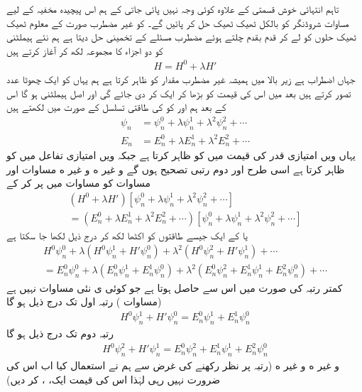 تاہم انتہائی خوش قسمتی کے علاوہ  کوئی وجہ   نہیں  پائی  جاتی کے ہم اس  پیچیدہ مخفیہ کے لیے مساوات شروڈنگر کو بالکل ٹھیک ٹھیک حل کر  پائیں  گے۔  کو    غیر  مضطرب صورت کے معلوم ٹھیک ٹھیک حلوں کو لے کر قدم بقدم چلتے ہوئے مضطرب مسئلے کے تخمینی حل دیتا ہے ہم نئے  ہیملٹنی کو دو اجزاء کا  مجموعہ لکھ کر آغاز کرتے ہیں 
\begin{align}
H = H^0 + \lambda H'
\end{align}
جہاں  اضطراب ہے زیر بالا میں  ہمیشہ  غیر  مضطرب مقدار کو ظاہر کرتا ہے ہم یہاں  کو ایک چھوٹا عدد تصور کرتے ہیں بعد میں اس کی قیمت کو بڑھا کر ایک  کر دی جائے گی اور  اصل ہیملٹنی ہو گا اس کے بعد ہم  اور  کو  کی طاقتی تسلسل کے صورت میں لکھتے ہیں 
\begin{align}
\psi_n &= \psi_n^0 + \lambda\psi_n^1 + \lambda^2\psi_n^2+\cdots \label{مساوات_اضطراب_سائے_این}\\
E_n &= E_n^0 + \lambda E_n^1 + \lambda^2 E_n^2+\cdots \label{مساوات_اضطراب_ای_این}
\end{align} 
یہاں  ویں امتیازی قدر کی قیمت میں  کو  ظاہر کرتا ہے جبکہ  ویں امتیازی تفاعل میں  کو   ظاہر کرتا ہے اسی طرح  اور  دوم رتبی تصحيح ہوں گے و غیر ه و  غیر ه مساوات  اور مساوات  کو مساوات  میں پر کر کے 
\begin{multline*}
(H^0 + \lambda H')[\psi_n^0 + \lambda \psi_n^1 + \lambda^2 \psi_n^2 + \cdots]\\
= (E_n^0 + \lambda E_n^1 + \lambda^2 E_n^2 + \cdots)[\psi_n^0 + \lambda \psi_n^1 + \lambda^2 \psi_n^2 + \cdots]
\end{multline*}
یا  کے ایک جیسے طاقتوں کو اکٹھا لکھ کر درج ذیل لکھا جا سکتا ہے 
\begin{multline*}
H^0 \psi_n^0 + \lambda (H^0 \psi_n^1 + H' \psi_n^0) + \lambda^2 (H^0 \psi_n^2 + H' \psi_n^1) + \cdots \\
= E_n^0 \psi_n^0 + \lambda (E_n^0 \psi_n^1 + E_n^1 \psi_n^0) + \lambda^2 (E_n^0 \psi_n^2 + E_n^1 \psi_n^1 + E_n^2 \psi_n^0) + \cdots
\end{multline*}
 کمتر رتبہ  کی صورت میں اس سے  حاصل ہوتا ہے جو  کوئی ی نئی مساوات نہیں ہے (مساوات ) رتبہ اول  تک درج ذیل ہو گا 
\begin{align}\label{مساوات_اضطراب_رتبہ_اول}
H^0 \psi_n^1 + H' \psi_n^0 = E_n^0 \psi_n^1 + E_n^1 \psi_n^0
\end{align}
رتبہ دوم  تک درج ذیل ہو گا 
\begin{align}\label{مساوات_اضطراب_رتبہ_دوم}
H^0 \psi_n^2 + H' \psi_n^1 = E_n^0 \psi_n^2 + E_n^1 \psi_n^1 + E_n^2 \psi_n^0
\end{align}
و غیر ه و غیر ه (رتبہ  پر نظر رکھنے کی غرض سے ہم نے  استعمال کیا اب اس کی ضرورت نہیں رہی لہٰذا اس کی قیمت ایک، ، کر دیں)

